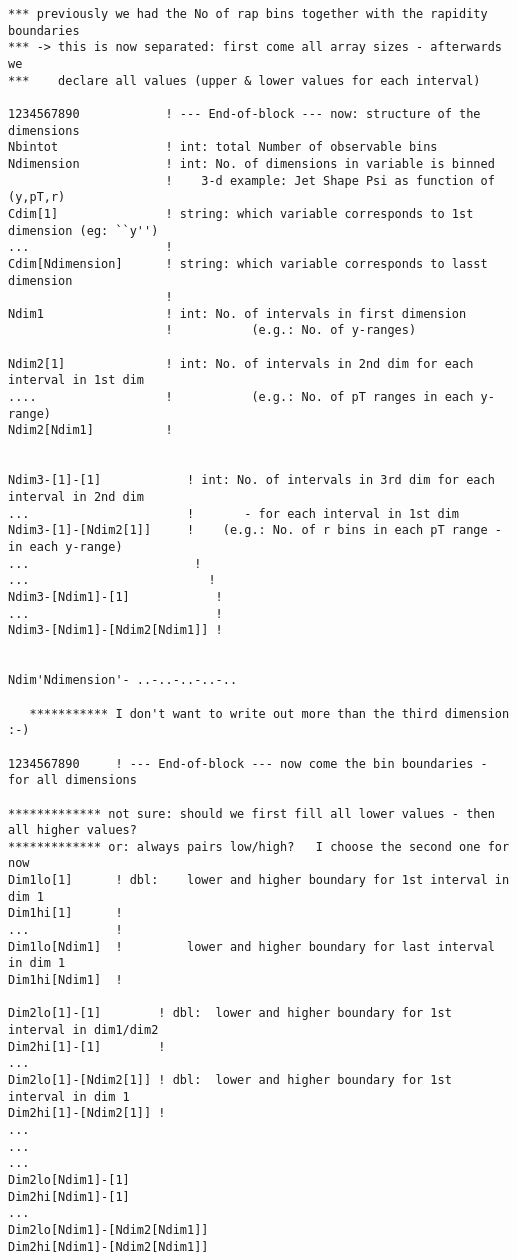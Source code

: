 {\begin{verbatim}
*** previously we had the No of rap bins together with the rapidity boundaries
*** -> this is now separated: first come all array sizes - afterwards we
***    declare all values (upper & lower values for each interval)

1234567890            ! --- End-of-block --- now: structure of the dimensions
Nbintot               ! int: total Number of observable bins
Ndimension            ! int: No. of dimensions in variable is binned
                      !    3-d example: Jet Shape Psi as function of (y,pT,r)
Cdim[1]               ! string: which variable corresponds to 1st dimension (eg: ``y'')
...                   !
Cdim[Ndimension]      ! string: which variable corresponds to lasst dimension
                      !
Ndim1                 ! int: No. of intervals in first dimension 
                      !           (e.g.: No. of y-ranges)

Ndim2[1]              ! int: No. of intervals in 2nd dim for each interval in 1st dim 
....                  !           (e.g.: No. of pT ranges in each y-range)
Ndim2[Ndim1]          !    


Ndim3-[1]-[1]            ! int: No. of intervals in 3rd dim for each interval in 2nd dim 
...                      !       - for each interval in 1st dim 
Ndim3-[1]-[Ndim2[1]]     !    (e.g.: No. of r bins in each pT range - in each y-range)
...                       !
...                         !
Ndim3-[Ndim1]-[1]            !
...                          !
Ndim3-[Ndim1]-[Ndim2[Ndim1]] !


Ndim'Ndimension'- ..-..-..-..-..

   *********** I don't want to write out more than the third dimension   :-)

1234567890     ! --- End-of-block --- now come the bin boundaries - for all dimensions

************* not sure: should we first fill all lower values - then all higher values?
************* or: always pairs low/high?   I choose the second one for now
Dim1lo[1]      ! dbl:    lower and higher boundary for 1st interval in dim 1
Dim1hi[1]      !
...            !
Dim1lo[Ndim1]  !         lower and higher boundary for last interval in dim 1
Dim1hi[Ndim1]  ! 

Dim2lo[1]-[1]        ! dbl:  lower and higher boundary for 1st interval in dim1/dim2
Dim2hi[1]-[1]        !
...
Dim2lo[1]-[Ndim2[1]] ! dbl:  lower and higher boundary for 1st interval in dim 1
Dim2hi[1]-[Ndim2[1]] !
...
...
...           
Dim2lo[Ndim1]-[1] 
Dim2hi[Ndim1]-[1] 
...
Dim2lo[Ndim1]-[Ndim2[Ndim1]]
Dim2hi[Ndim1]-[Ndim2[Ndim1]]


\end{verbatim}}
